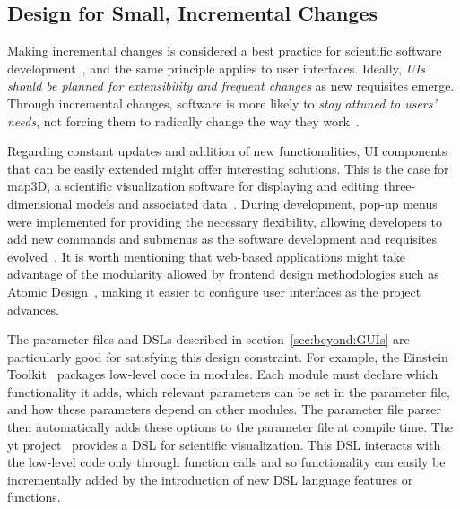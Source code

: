 \documentclass[conference]{IEEEtran}
\begin{document}
\subsection{Design for Small, Incremental Changes}

Making incremental changes is considered a best practice for scientific software 
development~\cite{bestprSC}, and the same principle applies to user interfaces. 
Ideally, \emph{UIs should be planned for extensibility and frequent changes} as 
new requisites emerge. Through incremental changes, software is more likely to 
\emph{stay attuned to users’ needs}, not forcing them to radically change the 
way they work~\cite{DeRoure:2009}. 

Regarding constant updates and addition of 
new functionalities, UI components that can be easily extended might offer 
interesting solutions. This is the case for map3D, a scientific 
visualization software for displaying and editing three-dimensional models and
associated data~\cite{SCI:Map3d}. During development, pop-up menus were
implemented for providing the necessary flexibility, allowing 
developers to add new commands and submenus as the software development 
and requisites evolved~\cite{MacLeod:1992}. It is worth mentioning that
web-based applications might take advantage of the modularity allowed by 
frontend design methodologies such as Atomic Design~\cite{Atomic}, making
it easier to configure user interfaces as the project advances.


The parameter files and DSLs described in section~\ref{sec:beyond:GUIs}
are particularly good for satisfying this design
constraint. For example, the Einstein Toolkit~\cite{Loffler:2011ay}
packages low-level code in modules. Each module must declare which
functionality it adds, which relevant parameters can be set in the
parameter file, and how these parameters depend on other modules. The parameter
file parser then automatically adds these options to the parameter
file at compile time. The yt project~\cite{2011ApJS..192....9T}
provides a DSL for scientific visualization. This DSL interacts with
the low-level code only through function calls and so functionality
can easily be incrementally added by the introduction of new DSL
language features or functions.
\end{document}
